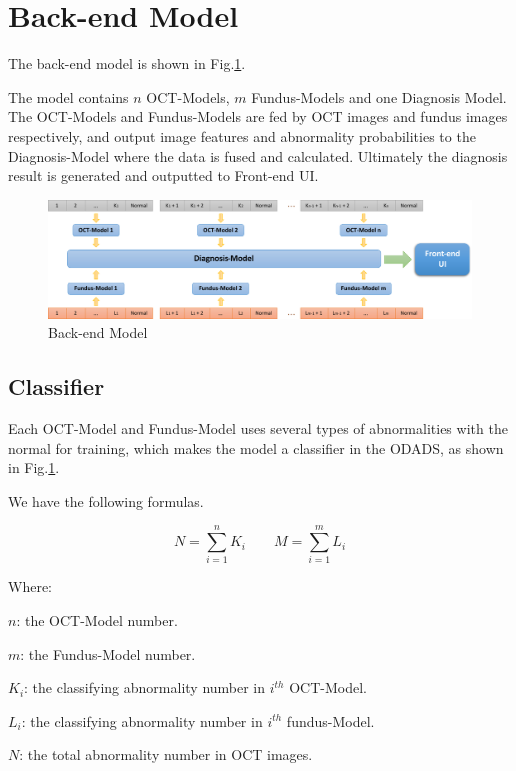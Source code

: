 \documentclass{article}
\begin{document}
	\section{Back-end Model}
	
		The back-end model is shown in Fig.\ref{fig:back-end}.  
		
		The model contains $n$ OCT-Models, $m$ Fundus-Models and one Diagnosis Model.  The OCT-Models and Fundus-Models are fed by OCT images and fundus images respectively, and output image features and abnormality probabilities to the Diagnosis-Model where the data is fused and calculated.  Ultimately the diagnosis result is generated and outputted to Front-end UI.

		\vspace{0.5cm}

		\begin{figure}[htbp]
			\centering
			\includegraphics[width=\linewidth]{Back-end.pdf}
			\caption{Back-end Model}
			\label{fig:back-end}
		\end{figure}
		
	\subsection{Classifier}
		Each OCT-Model and Fundus-Model uses several types of abnormalities with the normal for training, which makes the model a classifier in the ODADS, as shown in Fig.\ref{fig:back-end}. 
		
		We have the following formulas.

		\[
		N = \sum_{i=1}^{n} K_i \qquad M = \sum_{i=1}^{m} L_i
		\]
		
		Where:
		
		$n$: the OCT-Model number.
		
		$m$: the Fundus-Model number.
		
		$K_i$: the classifying abnormality number in $i^{th}$ OCT-Model.
		
		$L_i$: the classifying abnormality number in $i^{th}$ fundus-Model.
		
		$N$: the total abnormality number in OCT images.
		
\end{document}
